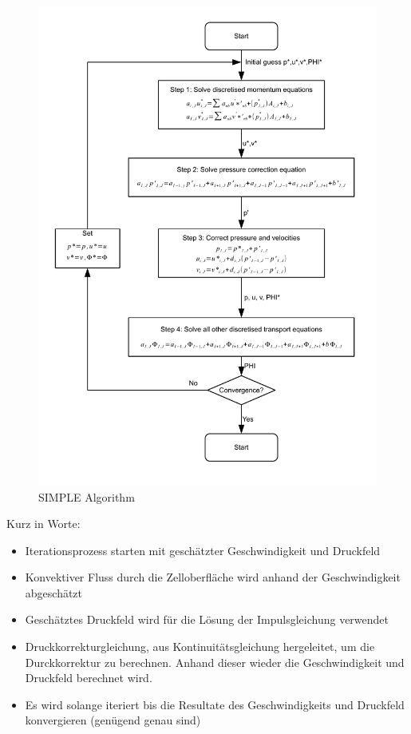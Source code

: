 \documentclass[a4paper]{scrartcl}
\begin{document}
\begin{figure}[h!]
\begin{center}
\includegraphics[scale=0.7]{images/simple_algorithm.pdf}
\caption{SIMPLE Algorithm}
\label{fig:SIMPLE1}
\end{center}
\end{figure}
Kurz in Worte:\\
\begin{itemize}
  \item Iterationsprozess starten mit geschätzter Geschwindigkeit und Druckfeld
  \item Konvektiver Fluss durch die Zelloberfläche wird anhand der
  Geschwindigkeit abgeschätzt
  \item Geschätztes Druckfeld wird für die Lösung der Impulsgleichung verwendet
  \item Druckkorrekturgleichung, aus Kontinuitätsgleichung hergeleitet, um die
  Durckkorrektur zu berechnen. Anhand dieser wieder die Geschwindigkeit und
  Druckfeld berechnet wird.
  \item Es wird solange iteriert bis die Resultate des Geschwindigkeits und
  Druckfeld konvergieren (genügend genau sind)
\end{itemize}
\end{document}

